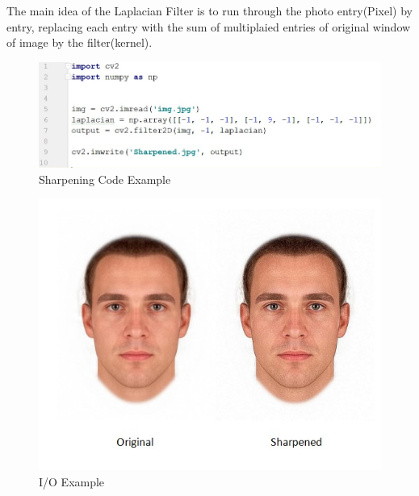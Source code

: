 The main idea of the Laplacian Filter is to run through the photo entry(Pixel) by entry, replacing each entry with the sum of multiplaied entries of original window of image by the filter(kernel).
\begin{figure}[H]
	\centering
	\includegraphics[width=\linewidth]{sharpening_code.jpg}
	\caption{Sharpening Code Example}
\end{figure}
\begin{figure}[H]
	\centering
	\includegraphics[width=\linewidth]{Sharpened.jpg}
	\caption{I/O Example}
\end{figure}


